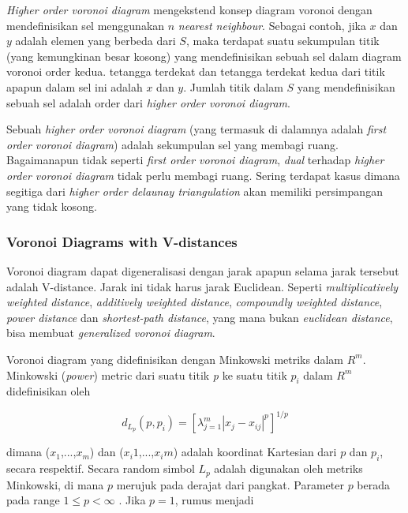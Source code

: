 \textit{Higher order voronoi diagram} mengekstend konsep diagram voronoi dengan mendefinisikan sel menggunakan $n$ \textit{nearest neighbour}. Sebagai contoh, jika $x$ dan $y$ adalah elemen yang berbeda dari $S$, maka terdapat suatu sekumpulan titik (yang kemungkinan besar kosong) yang mendefinisikan sebuah sel dalam diagram voronoi order kedua. tetangga terdekat dan tetangga terdekat kedua dari titik apapun dalam sel ini adalah $x$ dan $y$. Jumlah titik dalam $S$ yang mendefinisikan sebuah sel adalah order dari \textit{higher order voronoi diagram}.

Sebuah \textit{higher order voronoi diagram} (yang termasuk di dalamnya adalah \textit{first order voronoi diagram}) adalah sekumpulan sel yang membagi ruang. Bagaimanapun tidak seperti \textit{first order voronoi diagram}, \textit{dual} terhadap \textit{higher order voronoi diagram} tidak perlu membagi ruang. Sering terdapat kasus dimana segitiga dari \textit{higher order delaunay triangulation} akan memiliki persimpangan yang tidak kosong.

\subsubsection{Voronoi Diagrams with V-distances}

Voronoi diagram dapat digeneralisasi dengan jarak apapun selama jarak tersebut adalah V-distance. Jarak ini tidak harus jarak Euclidean. Seperti  \textit{multiplicatively weighted distance}, \textit{additively weighted distance}, \textit{compoundly weighted distance}, \textit{power distance} dan \textit{shortest-path distance}, yang mana bukan \textit{euclidean distance}, bisa membuat \textit{generalized voronoi diagram}. 

Voronoi diagram yang didefinisikan dengan Minkowski metriks dalam $R^m$. Minkowski (\textit{power}) metric dari suatu titik \textit{p} ke suatu titik $p_i$ dalam $R^m$ didefinisikan oleh

\begin{equation} \label{eqMinkowski}
d_L_p (p,p_i) = [\lambda_{j=1}^{m} | x_j - x_{ij} | ^ p]^{1/p}
\end{equation}

dimana ($x_1$,...,$x_m$) dan ($x_i1$,...,$x_im$) adalah koordinat Kartesian dari $p$ dan $p_i$, secara respektif. Secara random simbol $L_p$ adalah digunakan oleh metriks Minkowski, di mana $p$ merujuk pada derajat dari pangkat. Parameter $p$ berada pada range $1 \leq p < \infty$ . Jika $p = 1$, rumus \label{eqMinkowski} menjadi

